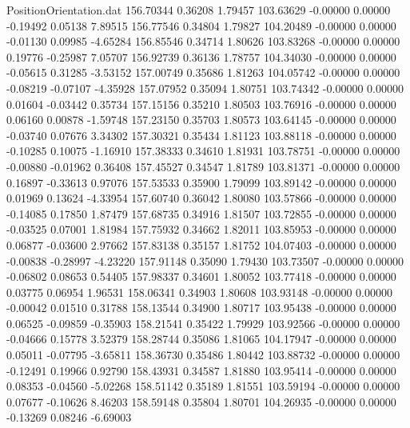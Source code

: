 \begin{filecontents}{PositionOrientation.dat}
 156.70344    0.36208    1.79457   103.63629   -0.00000    0.00000   -0.19492    0.05138    7.89515
 156.77546    0.34804    1.79827   104.20489   -0.00000    0.00000   -0.01130    0.09985   -4.65284
 156.85546    0.34714    1.80626   103.83268   -0.00000    0.00000    0.19776   -0.25987    7.05707
 156.92739    0.36136    1.78757   104.34030   -0.00000    0.00000   -0.05615    0.31285   -3.53152
 157.00749    0.35686    1.81263   104.05742   -0.00000    0.00000   -0.08219   -0.07107   -4.35928
 157.07952    0.35094    1.80751   103.74342   -0.00000    0.00000    0.01604   -0.03442    0.35734
 157.15156    0.35210    1.80503   103.76916   -0.00000    0.00000    0.06160    0.00878   -1.59748
 157.23150    0.35703    1.80573   103.64145   -0.00000    0.00000   -0.03740    0.07676    3.34302
 157.30321    0.35434    1.81123   103.88118   -0.00000    0.00000   -0.10285    0.10075   -1.16910
 157.38333    0.34610    1.81931   103.78751   -0.00000    0.00000   -0.00880   -0.01962    0.36408
 157.45527    0.34547    1.81789   103.81371   -0.00000    0.00000    0.16897   -0.33613    0.97076
 157.53533    0.35900    1.79099   103.89142   -0.00000    0.00000    0.01969    0.13624   -4.33954
 157.60740    0.36042    1.80080   103.57866   -0.00000    0.00000   -0.14085    0.17850    1.87479
 157.68735    0.34916    1.81507   103.72855   -0.00000    0.00000   -0.03525    0.07001    1.81984
 157.75932    0.34662    1.82011   103.85953   -0.00000    0.00000    0.06877   -0.03600    2.97662
 157.83138    0.35157    1.81752   104.07403   -0.00000    0.00000   -0.00838   -0.28997   -4.23220
 157.91148    0.35090    1.79430   103.73507   -0.00000    0.00000   -0.06802    0.08653    0.54405
 157.98337    0.34601    1.80052   103.77418   -0.00000    0.00000    0.03775    0.06954    1.96531
 158.06341    0.34903    1.80608   103.93148   -0.00000    0.00000   -0.00042    0.01510    0.31788
 158.13544    0.34900    1.80717   103.95438   -0.00000    0.00000    0.06525   -0.09859   -0.35903
 158.21541    0.35422    1.79929   103.92566   -0.00000    0.00000   -0.04666    0.15778    3.52379
 158.28744    0.35086    1.81065   104.17947   -0.00000    0.00000    0.05011   -0.07795   -3.65811
 158.36730    0.35486    1.80442   103.88732   -0.00000    0.00000   -0.12491    0.19966    0.92790
 158.43931    0.34587    1.81880   103.95414   -0.00000    0.00000    0.08353   -0.04560   -5.02268
 158.51142    0.35189    1.81551   103.59194   -0.00000    0.00000    0.07677   -0.10626    8.46203
 158.59148    0.35804    1.80701   104.26935   -0.00000    0.00000   -0.13269    0.08246   -6.69003

\end{filecontents}
